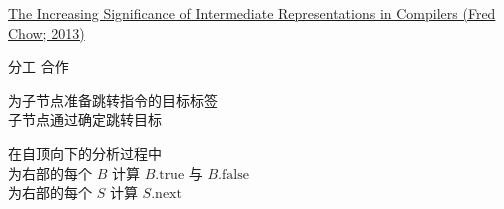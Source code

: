 

\begin{frame}{}
  \begin{center}
    \href{https://dl.acm.org/doi/pdf/10.1145/2542661.2544374}{The Increasing Significance of Intermediate Representations in Compilers (Fred Chow; 2013)}
  \end{center}
\end{frame}

\begin{frame}
\end{frame}

\begin{frame}{}
  \begin{center}
    {\Large 分工 \qquad 合作}

    \vspace{0.30cm}
  \end{center}

  \pause
  \vspace{0.30cm}
  \begin{center}
    为子节点准备跳转指令的目标标签 \\[5pt]
    子节点通过确定跳转目标
  \end{center}
\end{frame}

\begin{frame}{}
  \begin{center}
    在自顶向下的分析过程中 \\[15pt]

    为右部的每个 $B$ 计算 $B.\text{true}$ 与 $B.\text{false}$ \\[10pt]
    为右部的每个 $S$ 计算 $S.\text{next}$
  \end{center}
\end{frame}

\begin{frame}{}
  \begin{columns}
  \end{columns}
\end{frame}
